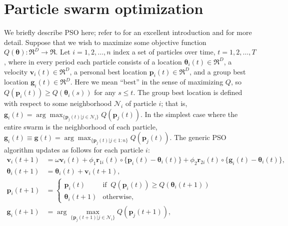 \documentclass[12pt]{article}
\begin{document}
\section{Particle swarm optimization}\label{sec:pso}
We briefly describe PSO here; refer to \citet{blum2008swarm} for an excellent introduction and \citet{clerc2010particle} for more detail. Suppose that we wish to maximize some objective function $Q(\bm{\theta}):\Re^D\to\Re$. Let $i=1,2,\dots,n$ index a set of particles over time, $t=1,2,\dots,T$, where in every period each particle consists of a location $\bm{\theta}_i(t)\in \Re^D$, a velocity $\bm{v}_i(t) \in \Re^D$, a personal best location $\bm{p}_i(t)\in\Re^D$, and a group best location $\bm{g}_i(t)\in\Re^D$. Here we mean ``best'' in the sense of maximizing $Q$, so $Q(\bm{p}_i(t)) \geq Q(\bm{\theta}_i(s))$ for any $s\leq t$. The group best location is defined with respect to some neighborhood $\mathcal{N}_i$ of particle $i$; that is, $\bm{g}_i(t) = \arg\max_{\{\bm{p}_j(t)|j\in\mathcal{N}_i\}}Q(\bm{p}_j(t))$. In the simplest case where the entire swarm is the neighborhood of each particle, $\bm{g}_i(t)\equiv \bm{g}(t) = \arg\max_{\{\bm{p}_j(t)|j\in 1:n\}}Q(\bm{p}_j(t))$. The generic PSO algorithm updates as follows for each particle $i$:
\begin{align}\label{eq:pso}
\bm{v}_i(t+1) &= \omega \bm{v}_i(t) + \phi_1 \bm{r}_{1i}(t)\circ\{\bm{p}_i(t) - \bm{\theta}_i(t)\} + \phi_2 \bm{r}_{2i}(t)\circ\{\bm{g}_i(t) - \bm{\theta}_i(t)\},\nonumber\\
\bm{\theta}_i(t+1) &= \bm{\theta}_i(t) + \bm{v}_i(t+1),\nonumber\\
\bm{p}_i(t+1) &= \begin{cases} \bm{p}_i(t)   & \mbox{if }\  Q(\bm{p}_i(t)) \ge Q(\bm{\theta}_i(t + 1))\\
                               \bm{\theta}_i(t+1) & \mbox{otherwise},
\end{cases}\nonumber\\
\bm{g}_i(t+1) &= \arg\max_{\{\bm{p}_j(t+1)|j\in\mathcal{N}_i\}}Q(\bm{p}_j(t+1)),
\end{align}
\end{document}

